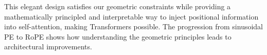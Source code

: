 \documentclass{article}
\begin{document}
This elegant design satisfies our geometric constraints while providing a mathematically principled and interpretable way to inject positional information into self-attention, making Transformers possible. The progression from sinusoidal PE to RoPE shows how understanding the geometric principles leads to architectural improvements.
\end{document}
